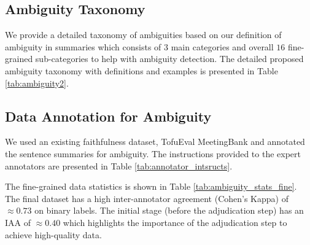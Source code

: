 \subsection{Ambiguity Taxonomy}\label{app:taxonomy}
We provide a detailed taxonomy of ambiguities based on our definition of ambiguity in summaries which consists of $3$ main categories and overall $16$ fine-grained sub-categories to help with ambiguity detection. 
The detailed proposed ambiguity taxonomy with definitions and examples is presented in Table \ref{tab:ambiguity2}.




















\subsection{Data Annotation for Ambiguity}\label{app:ambiguity-data-stats}
We used an existing faithfulness dataset, TofuEval MeetingBank \cite{tang2024tofueval} and annotated the sentence summaries for ambiguity.
The instructions provided to the expert annotators are presented in Table \ref{tab:annotator_intsructs}.


The fine-grained data statistics is shown in Table \ref{tab:ambiguity_stats_fine}. The final dataset has a high inter-annotator agreement (Cohen's Kappa) of $\approx0.73$ on binary labels.  
The initial stage (before the adjudication step) has an IAA of $\approx0.40$ which highlights the importance of the adjudication step to achieve high-quality data.
% 



